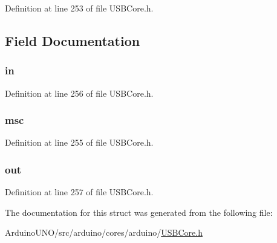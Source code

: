 Definition at line 253 of file U\+S\+B\+Core.\+h.



\subsection{Field Documentation}
\hypertarget{struct_m_s_c_descriptor_a93dcef3b3e3062b904269bcad94771b5}{}
\subsubsection[{in}]{ in}\label{struct_m_s_c_descriptor_a93dcef3b3e3062b904269bcad94771b5}


Definition at line 256 of file U\+S\+B\+Core.\+h.

\hypertarget{struct_m_s_c_descriptor_af01c68cfcf5830b0d5ff44c2751c12c0}{}
\subsubsection[{msc}]{ msc}\label{struct_m_s_c_descriptor_af01c68cfcf5830b0d5ff44c2751c12c0}


Definition at line 255 of file U\+S\+B\+Core.\+h.

\hypertarget{struct_m_s_c_descriptor_afcf3c947c6e5ace7853bc3e313c0c4aa}{}
\subsubsection[{out}]{ out}\label{struct_m_s_c_descriptor_afcf3c947c6e5ace7853bc3e313c0c4aa}


Definition at line 257 of file U\+S\+B\+Core.\+h.



The documentation for this struct was generated from the following file\+:\begin{DoxyCompactItemize}
\item 
Arduino\+U\+N\+O/src/arduino/cores/arduino/\hyperlink{_u_s_b_core_8h}{U\+S\+B\+Core.\+h}\end{DoxyCompactItemize}
